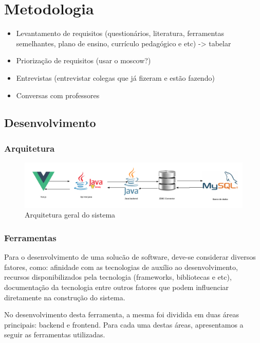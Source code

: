 \chapter{Metodologia}

\begin{itemize}
	\item Levantamento de requisitos (questionários, literatura, ferramentas semelhantes, plano de ensino, currículo pedagógico e etc) -> tabelar
	\item Priorização de requisitos (usar o moscow?)
	\item Entrevistas (entrevistar colegas que já fizeram e estão fazendo)
	\item Conversas com professores
\end{itemize}

\section{Desenvolvimento}

\subsection{Arquitetura}

\begin{figure}[h]
	\centering
	\includegraphics[keepaspectratio=true,scale=0.2]{figuras/arquitetura.png}
	\caption{Arquitetura geral do sistema}
	\label{fig2}
\end{figure}

\subsection{Ferramentas}

Para o desenvolvimento de uma solucão de software, deve-se considerar diversos
fatores, como: afinidade com as tecnologias de auxílio ao desenvolvimento, recursos disponibilizados pela tecnologia 
(frameworks, bibliotecas e etc), documentação da tecnologia entre outros fatores que podem influenciar diretamente
na construção do sistema.

No desenvolvimento desta ferramenta, a mesma foi dividida em duas áreas principais: backend e frontend. Para cada uma destas
áreas, apresentamos a seguir as ferramentas utilizadas.
